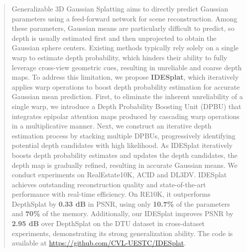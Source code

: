 \begin{abstract}
%
Generalizable 3D Gaussian Splatting aims to directly predict Gaussian parameters using a feed-forward network for scene reconstruction.
%
Among these parameters, Gaussian means are particularly difficult to predict, so depth is usually estimated first and then unprojected to obtain the Gaussian sphere centers.
%
Existing methods typically rely solely on a single warp to estimate depth probability, which hinders their ability to fully leverage cross-view geometric cues, resulting in unreliable and coarse depth maps.
%
To address this limitation, we propose \textbf{IDESplat}, which iteratively applies warp operations to boost depth probability estimation for accurate Gaussian mean prediction.
%
First, to eliminate the inherent unreliability of a single warp, we introduce a Depth Probability Boosting Unit (DPBU) that integrates epipolar attention maps produced by cascading warp operations in a multiplicative manner.
%
Next, we construct an iterative depth estimation process by stacking multiple DPBUs, progressively identifying potential depth candidates with high likelihood.
%
As IDESplat iteratively boosts depth probability estimates and updates the depth candidates, the depth map is gradually refined, resulting in accurate Gaussian means.
%
%
We conduct experiments on RealEstate10K, ACID and DL3DV.
%
IDESplat achieves outstanding reconstruction quality and state-of-the-art performance with real-time efficiency.
%
On RE10K, it outperforms DepthSplat by \textbf{0.33 dB} in PSNR, using only \textbf{10.7\%} of the parameters and \textbf{70\%} of the memory.
%
Additionally, our IDESplat improves PSNR by \textbf{2.95 dB} over DepthSplat on the DTU dataset in cross-dataset experiments, demonstrating its strong generalization ability.
%
The code is available at {\href{https://github.com/CVL-UESTC/IDESplat}{https://github.com/CVL-UESTC/IDESplat}}.

\end{abstract}





